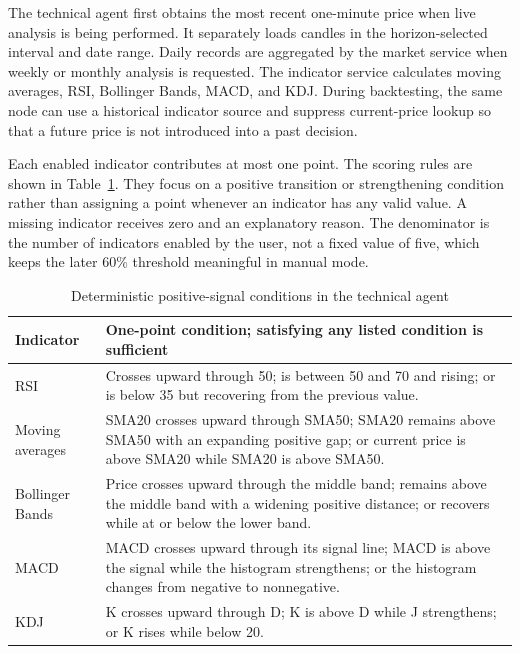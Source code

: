 The technical agent first obtains the most recent one-minute price when live analysis is being performed. It separately loads candles in the horizon-selected interval and date range. Daily records are aggregated by the market service when weekly or monthly analysis is requested. The indicator service calculates moving averages, RSI, Bollinger Bands, MACD, and KDJ. During backtesting, the same node can use a historical indicator source and suppress current-price lookup so that a future price is not introduced into a past decision.

Each enabled indicator contributes at most one point. The scoring rules are shown in Table~\ref{tab:technical-signal-scoring}. They focus on a positive transition or strengthening condition rather than assigning a point whenever an indicator has any valid value. A missing indicator receives zero and an explanatory reason. The denominator is the number of indicators enabled by the user, not a fixed value of five, which keeps the later 60\% threshold meaningful in manual mode.

\begin{table}[H]
    \centering
    \caption{Deterministic positive-signal conditions in the technical agent}
    \label{tab:technical-signal-scoring}
    \footnotesize
    \setlength{\tabcolsep}{4pt}
    \renewcommand{\arraystretch}{1.18}
    \begin{tabular}{p{1.65cm} p{10.9cm}}
        \toprule
        \textbf{Indicator} & \textbf{One-point condition; satisfying any listed condition is sufficient} \\
        \midrule
        RSI & Crosses upward through 50; is between 50 and 70 and rising; or is below 35 but recovering from the previous value. \\
        Moving averages & SMA20 crosses upward through SMA50; SMA20 remains above SMA50 with an expanding positive gap; or current price is above SMA20 while SMA20 is above SMA50. \\
        Bollinger Bands & Price crosses upward through the middle band; remains above the middle band with a widening positive distance; or recovers while at or below the lower band. \\
        MACD & MACD crosses upward through its signal line; MACD is above the signal while the histogram strengthens; or the histogram changes from negative to nonnegative. \\
        KDJ & K crosses upward through D; K is above D while J strengthens; or K rises while below 20. \\
        \bottomrule
    \end{tabular}
\end{table}

